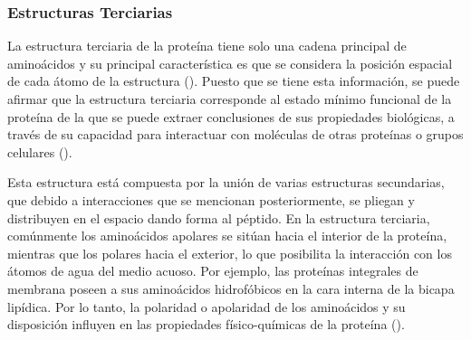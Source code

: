 
\subsubsection{Estructuras Terciarias}
\label{fundamentos:estructura-terciaria}

La estructura terciaria de la proteína tiene solo una cadena principal de aminoácidos y su principal característica es que se considera la posición espacial de cada átomo de la estructura (\citealp{branden:1999}). Puesto que se tiene esta información, se puede afirmar que la estructura terciaria corresponde al estado mínimo funcional de la proteína de la que se puede extraer conclusiones de sus propiedades biológicas, a través de su capacidad para interactuar con moléculas de otras proteínas o grupos celulares (\citealp{molecular:book}).

Esta estructura está compuesta por la unión de varias estructuras secundarias, que debido a interacciones que se mencionan posteriormente, se pliegan y distribuyen en el espacio dando forma al péptido. En la estructura terciaria, comúnmente los aminoácidos apolares se sitúan hacia el interior de la proteína, mientras que los polares hacia el exterior, lo que posibilita la interacción con los átomos de agua del medio acuoso. Por ejemplo, las proteínas integrales de membrana poseen a sus aminoácidos hidrofóbicos en la cara interna de la bicapa lipídica. Por lo tanto, la polaridad o apolaridad de los aminoácidos y su disposición influyen en las propiedades físico-químicas de la proteína (\citealp{branden:1999}).

